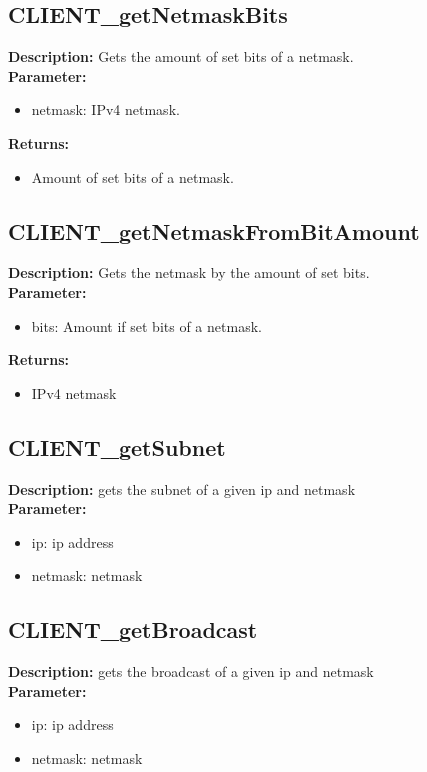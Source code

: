 \subsection{CLIENT\_getNetmaskBits}
\textbf{Description:} Gets the amount of set bits of a netmask.\\
\textbf{Parameter:}
\begin{itemize}
\item netmask: IPv4 netmask.
\end{itemize}
\textbf{Returns:}
\begin{itemize}
\item Amount of set bits of a netmask.
\end{itemize}

\subsection{CLIENT\_getNetmaskFromBitAmount}
\textbf{Description:} Gets the netmask by the amount of set bits.\\
\textbf{Parameter:}
\begin{itemize}
\item bits: Amount if set bits of a netmask.
\end{itemize}
\textbf{Returns:}
\begin{itemize}
\item IPv4 netmask
\end{itemize}

\subsection{CLIENT\_getSubnet}
\textbf{Description:} gets the subnet of a given ip and netmask\\
\textbf{Parameter:}
\begin{itemize}
\item ip: ip address
\item netmask: netmask
\end{itemize}

\subsection{CLIENT\_getBroadcast}
\textbf{Description:} gets the broadcast of a given ip and netmask\\
\textbf{Parameter:}
\begin{itemize}
\item ip: ip address
\item netmask: netmask
\end{itemize}

